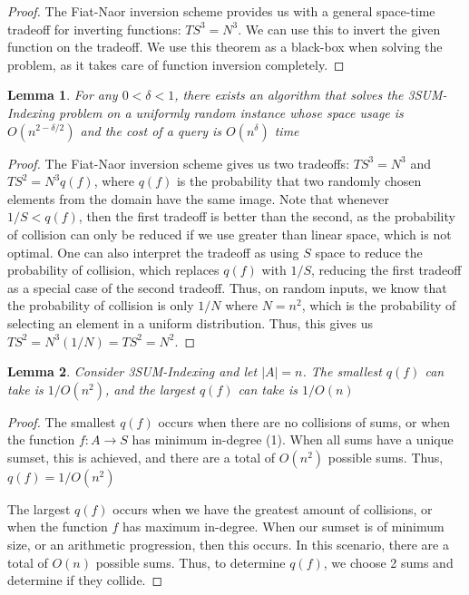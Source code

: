 \documentclass{article}
\newtheorem{lemma}{Lemma}
\begin{document}
\begin{proof}
The Fiat-Naor inversion scheme provides us with a general space-time tradeoff for inverting functions: $TS^3 = N^3$. We can use this to invert the given function on the tradeoff. We use this theorem as a black-box when solving the problem, as it takes care of function inversion completely. 
\end{proof}

\begin{lemma}
\label{Random Instances}
For any $0 < \delta < 1$, there exists an algorithm that solves the 3SUM-Indexing problem on a uniformly random instance whose space usage is $O(n^{2 - \delta/2})$ and the cost of a query is $O(n^{\delta})$ time
\end{lemma}

\begin{proof}
The Fiat-Naor inversion scheme gives us two tradeoffs: $TS^3 = N^3$ and $TS^2 = N^3q(f)$, where $q(f)$ is the probability that two randomly chosen elements from the domain have the same image. Note that whenever $1/S < q(f)$, then the first tradeoff is better than the second, as the probability of collision can only be reduced if we use greater than linear space, which is not optimal. One can also interpret the tradeoff as using $S$ space to reduce the probability of collision, which replaces $q(f)$ with $1/S$, reducing the first tradeoff as a special case of the second tradeoff. Thus, on random inputs, we know that the probability of collision is only $1/N$ where $N=n^2$, which is the probability of selecting an element in a uniform distribution. Thus, this gives us $TS^2 = N^3(1/N) = TS^2 = N^2$.
\end{proof}

\begin{lemma}
\label{Min and Max q(f) values}
Consider 3SUM-Indexing and let $|A| = n$. The smallest $q(f)$ can take is $1/O(n^2)$, and the largest $q(f)$ can take is $1/O(n)$
\end{lemma}

\begin{proof} %
The smallest $q(f)$ occurs when there are no collisions of sums, or when the function $f: A \rightarrow S$ has minimum in-degree (1). When all sums have a unique sumset, this is achieved, and there are a total of $O(n^2)$ possible sums. Thus, $q(f) = 1/O(n^2)$

The largest $q(f)$ occurs when we have the greatest amount of collisions, or when the function $f$ has maximum in-degree. When our sumset is of minimum size, or an arithmetic progression, then this occurs. In this scenario, there are a total of $O(n)$ possible sums. Thus, to determine $q(f)$, we choose 2 sums and determine if they collide. %
\end{proof}
\end{document}
